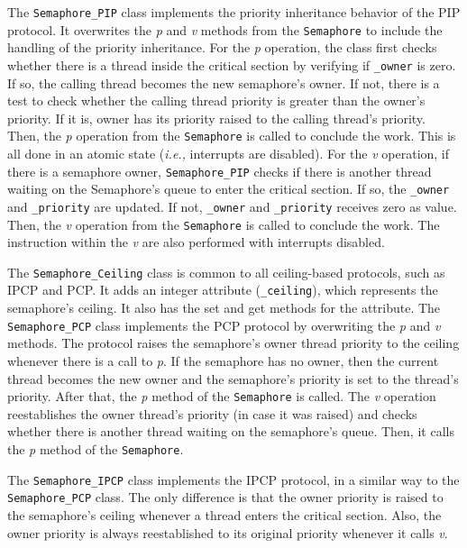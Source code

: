 The \texttt{Semaphore\_PIP} class implements the priority inheritance 
behavior of the PIP protocol. It overwrites the \emph{p} and \emph{v} methods 
from the \texttt{Semaphore} to include the handling of the priority 
inheritance.  For the \emph{p} operation, the class first checks whether there 
is a thread inside the critical section by verifying if \texttt{\_owner} is 
zero. If so, the calling thread becomes the new semaphore's owner. If not, 
there is a test to check whether the calling thread priority is greater than 
the owner's priority. If it is, owner has its priority raised to the calling 
thread's priority. Then, the \emph{p} operation from the \texttt{Semaphore} is 
called to conclude the work. This is all done in an atomic state (\emph{i.e.,} 
interrupts are disabled). For the \emph{v} operation, if there is a semaphore 
owner, \texttt{Semaphore\_PIP} checks if there is another thread waiting on the 
Semaphore's queue to enter the critical section. If so, the \texttt{\_owner} 
and \texttt{\_priority} are updated. If not, \texttt{\_owner} and 
\texttt{\_priority} receives zero as value. Then, the \emph{v} operation from 
the \texttt{Semaphore} is called to conclude the work. The instruction within 
the \emph{v} are also performed with interrupts disabled.

The \texttt{Semaphore\_Ceiling} class is common to all ceiling-based protocols, 
such as IPCP and PCP. It adds an integer attribute (\texttt{\_ceiling}), which 
represents the semaphore's ceiling. It also has the set and get methods for the 
attribute. The \texttt{Semaphore\_PCP} class implements the PCP protocol by 
overwriting the \emph{p} and \emph{v} methods. The protocol raises the 
semaphore's owner thread priority to the ceiling whenever there is a call to 
\emph{p}. If the semaphore has no owner, then the current thread becomes the 
new owner and the semaphore's priority is set to the thread's priority. After 
that, the \emph{p} method of the \texttt{Semaphore} is called. The \emph{v} 
operation reestablishes the owner thread's priority (in case it was raised) and 
checks whether there is another thread waiting on the semaphore's queue. Then, 
it calls the \emph{p} method of the \texttt{Semaphore}. 

The \texttt{Semaphore\_IPCP} class implements the IPCP protocol, in a similar 
way to the \texttt{Semaphore\_PCP} class. The only difference is that the owner 
priority is raised to the semaphore's ceiling whenever a thread enters the 
critical section. Also, the owner priority is always reestablished to its 
original priority whenever it calls \emph{v}.

